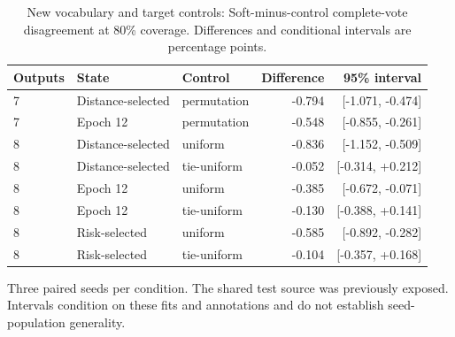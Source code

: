 \begin{table}[!htbp]\centering\caption{New vocabulary and target controls: Soft-minus-control complete-vote disagreement at 80\% coverage. Differences and conditional intervals are percentage points.}\label{tab:newfollowup}
\small\begin{tabular}{lllr r}\toprule Outputs & State & Control & Difference & 95\% interval \\ \midrule
7 & Distance-selected & permutation & -0.794 & [-1.071, -0.474] \\
7 & Epoch 12 & permutation & -0.548 & [-0.855, -0.261] \\
8 & Distance-selected & uniform & -0.836 & [-1.152, -0.509] \\
8 & Distance-selected & tie-uniform & -0.052 & [-0.314, +0.212] \\
8 & Epoch 12 & uniform & -0.385 & [-0.672, -0.071] \\
8 & Epoch 12 & tie-uniform & -0.130 & [-0.388, +0.141] \\
8 & Risk-selected & uniform & -0.585 & [-0.892, -0.282] \\
8 & Risk-selected & tie-uniform & -0.104 & [-0.357, +0.168] \\
\bottomrule\end{tabular}\par\smallskip\footnotesize Three paired seeds per condition. The shared test source was previously exposed. Intervals condition on these fits and annotations and do not establish seed-population generality.\end{table}